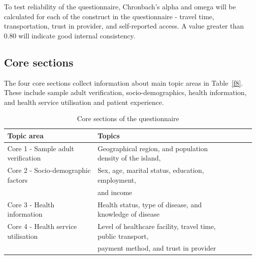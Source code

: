 
To test reliability of the questionnaire, Chronbach's alpha and omega will be calculated for each of the construct in the questionnaire - travel time, transportation, trust in provider, and self-reported access. A value greater than 0.80 will indicate good internal consistency. 

\subsection{Core sections}

The four core sections collect information about main topic areas in Table~\ref{f8}. These include sample adult verification, socio-demographics, health information, and health service utilisation and patient experience.

\begin{table}[!ht]
    \centering
    \begin{tabular}{@{}lllrl@{}}\toprule
     Topic area                     & Topics    \\ \midrule
     Core 1 - Sample adult verification  & Geographical region, and population density of the island, \\    
     Core 2 - Socio-demographic factors  & Sex, age, marital status, education, employment,  \\  
                                         & and income \\
     Core 3 - Health information         & Health status, type of disease, and knowledge of disease\\ 
     Core 4 - Health service utilisation & Level of healthcare facility, travel time, public transport, \\
                                         & payment method, and trust in provider \\\bottomrule
    \end{tabular}
    \caption{Core sections of the questionnaire}
    \resizebox{0.50\linewidth}{!}{
    \label{f8}
}
\end{table}

